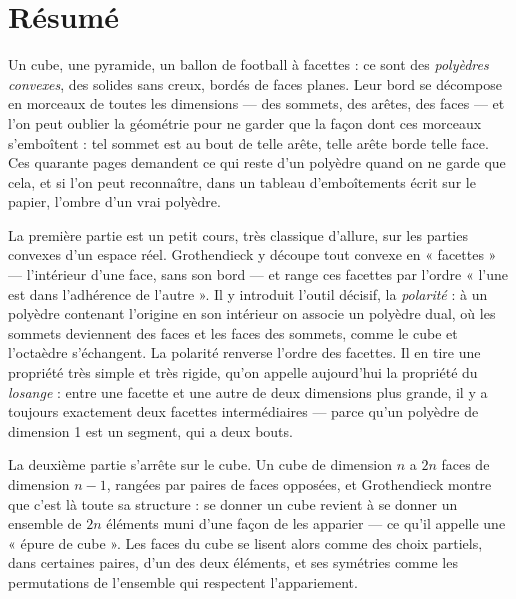 \documentclass[11pt,a4paper]{article}
\begin{document}
\section*{Résumé}

\begin{resume}
Un cube, une pyramide, un ballon de football à facettes : ce sont des
\emph{polyèdres convexes}, des solides sans creux, bordés de faces planes. Leur
bord se décompose en morceaux de toutes les dimensions --- des sommets, des
arêtes, des faces --- et l'on peut oublier la géométrie pour ne garder que la
façon dont ces morceaux s'emboîtent : tel sommet est au bout de telle arête,
telle arête borde telle face. Ces quarante pages demandent ce qui reste d'un
polyèdre quand on ne garde que cela, et si l'on peut reconnaître, dans un
tableau d'emboîtements écrit sur le papier, l'ombre d'un vrai polyèdre.

La première partie est un petit cours, très classique d'allure, sur les parties
convexes d'un espace réel. Grothendieck y découpe tout convexe en
« facettes » --- l'intérieur d'une face, sans son bord --- et range ces
facettes par l'ordre « l'une est dans l'adhérence de l'autre ». Il y introduit
l'outil décisif, la \emph{polarité} : à un polyèdre contenant l'origine en son
intérieur on associe un polyèdre dual, où les sommets deviennent des faces et
les faces des sommets, comme le cube et l'octaèdre s'échangent. La polarité
renverse l'ordre des facettes. Il en tire une propriété très simple et très
rigide, qu'on appelle aujourd'hui la propriété du \emph{losange} : entre une
facette et une autre de deux dimensions plus grande, il y a toujours exactement
deux facettes intermédiaires --- parce qu'un polyèdre de dimension 1 est un
segment, qui a deux bouts.

La deuxième partie s'arrête sur le cube. Un cube de dimension $n$ a $2n$ faces
de dimension $n-1$, rangées par paires de faces opposées, et Grothendieck
montre que c'est là toute sa structure : se donner un cube revient à se donner
un ensemble de $2n$ éléments muni d'une façon de les apparier --- ce qu'il
appelle une « épure de cube ». Les faces du cube se lisent alors comme des
choix partiels, dans certaines paires, d'un des deux éléments, et ses symétries
comme les permutations de l'ensemble qui respectent l'appariement.


\end{resume}
\end{document}

